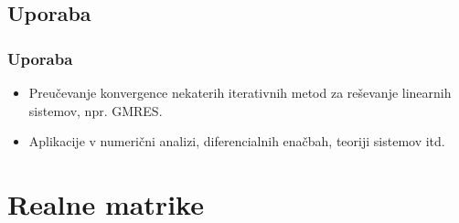 \documentclass{beamer}
\begin{document}
\subsection{Uporaba}
\begin{frame}
\frametitle{Uporaba}
\begin{itemize}
\item Preučevanje konvergence nekaterih iterativnih metod za reševanje linearnih sistemov, npr. GMRES.\medskip
\item Aplikacije v numerični analizi, diferencialnih enačbah, teoriji sistemov itd.
\end{itemize}
\end{frame}
\section{Realne matrike} %
\end{document}
